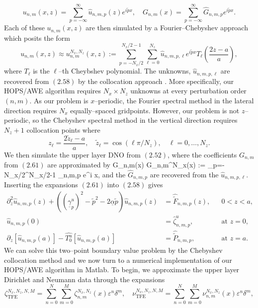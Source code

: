 \begin{equation}u_{n,m}(x,z)=\sum_{p=-\infty}^{\infty}\hat{u}_{n,m,p}(z)e^{i\tilde{p} x},\quad G_{n,m}(x)=\sum_{p=-\infty}^{\infty}\hat{G}_{n,m,p}e^{i\tilde{p} x}.\end{equation}
Each of these $u_{n,m}(x,z)$ are then simulated by a 
Fourier--Chebyshev approach which posits the form
$$
u_{n,m}(x,z) \approx u_{n,m}^{N_x,N_z}(x,z)
  := \sum_{p = -N_x/2}^{N_x/2-1} \sum_{\ell=0}^{N_z}
  \hat{u}_{n,m,p,\ell} e^{i \tilde{p} x} 
  T_{\ell} \left( \frac{2z-a}{a} \right),
$$
where $T_{\ell}$ is the $\ell$--th Cheybshev polynomial.
The unknowns, $\hat{u}_{n,m,p,\ell}$ are recovered 
from $(2.58)$ by the collocation approach 
\cite{GottliebOrszag77,CHQZ88,Boyd01,ShenTang06,ShenTangWang11}. More specifically, our HOPS/AWE algorithm requires $N_x \times N_z$ unknowns at every perturbation order $(n,m)$. As our problem is $x$--periodic, the Fourier spectral method in the lateral direction requires $N_x$ equally--spaced gridpoints. However, our problem is not $z$--periodic, so the Chebyshev spectral method in the vertical direction requires $N_z+1$ collocation points where
$$z_{\ell}=\frac{2\tilde{z}_{\ell}-a}{a}, \quad \tilde{z}_{\ell}=\cos\left(\ell\pi/N_z\right),\quad \ell = 0,\ldots,N_z.$$
We then simulate the upper layer DNO from 
$(2.52)$, where the coefficients $G_{n,m}$ from $(2.61)$ are approximated by
\be
G_{n,m}(x) \approx G_{n,m}^{N_x}(x) 
  := \sum_{p=-N_x/2}^{N_x/2-1} _{n,m,p} e^{i  x},
\ee
and the $\hat{G}_{n,m,p}$ are recovered from the
$\hat{u}_{n,m,p,\ell}$. Inserting the expansions $(2.61)$ into $(2.58)$ gives
\begin{subequations}
\begin{align}
\partial_z^2\hat{u}_{n,m,p}(z)+\left((\underline{\gamma}_p^u)^2-\tilde{p}^2-2\underline{\alpha}\tilde{p}\right)\hat{u}_{n,m,p}(z)&=\hat{\tilde{F}}_{n,m,p}(z),&&\text{$0<z<a$},\\
\hat{u}_{n,m,p}(0)&=\hat{\zeta}^u_{n,m,p},&& \text{at $z=0$},\\
\partial_z \left[\hat{u}_{n,m,p}(a)\right] - \hat{T_0^u}[\hat{u}_{n,m,p}(a)]&=\hat{\tilde{P}}_{n,m,p},&& \text{at $z=a$}.
\end{align}
\end{subequations}
We can solve this two--point boundary value problem by the Chebyshev collocation method and we now turn to a  numerical implementation of our HOPS/AWE algorithm in Matlab. To begin, we approximate the upper layer Dirichlet and Neumann data through the expansions
$$\zeta_{\text{TFE}}^{N_x,N_z,N,M}=\sum_{n=0}^N\sum_{m=0}^M \zeta_{n,m}^{N_x,N_z}(x)\varepsilon^n\delta^m, \quad
\nu_{\text{TFE}}^{N_x,N_z,N,M}=\sum_{n=0}^N\sum_{m=0}^M \nu_{n,m}^{N_x,N_z}(x)\varepsilon^n\delta^m,$$
